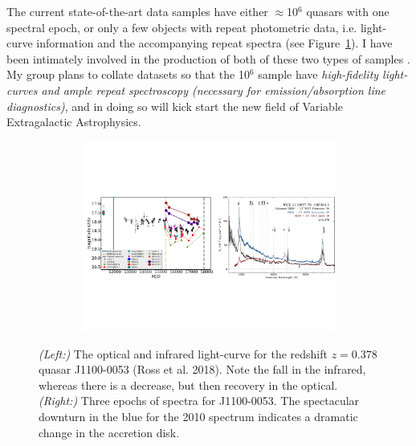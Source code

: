 \documentclass[oneside, a4paper, onecolumn, 11pt]{article}
\begin{document}
\smallskip
\noindent
The current state-of-the-art data samples have either
$\approx$10$^{6}$ quasars with one spectral epoch, or only a few
objects with repeat photometric data, i.e. light-curve information and
the accompanying repeat spectra (see Figure~\ref{fig:J110057}). I have
been intimately involved in the production of both of these two types
of samples \citep{MacLeod2016, Paris2017}. My group plans to collate
datasets so that the 10$^{6}$ sample have {\it high-fidelity
light-curves and ample repeat spectroscopy (necessary for
emission/absorption line diagnostics)}, and in doing so will kick
start the new field of Variable Extragalactic Astrophysics.

\begin{figure}[h]
  \begin{center}
    \hspace{-0.5cm}
    \includegraphics[height=6.25cm,width=17.2cm]
    {figures/J110057_LC_Spectra_20171024.pdf}
    \vspace{-10pt}
    \caption{\small    %
      {\it (Left:)} The optical and infrared light-curve for the redshift $z=0.378$ quasar 
      J1100-0053 (Ross et al. 2018). 
      Note the fall in the infrared, whereas there is a decrease, but 
      then recovery in the optical. 
      {\it (Right:)} 
      Three epochs of spectra for J1100-0053. 
      The spectacular downturn in the blue for the 2010 spectrum 
      indicates a dramatic change in the accretion disk.
    }
  \vspace{-22pt}
 \label{fig:J110057}
\end{center}
\end{figure}
\end{document}
